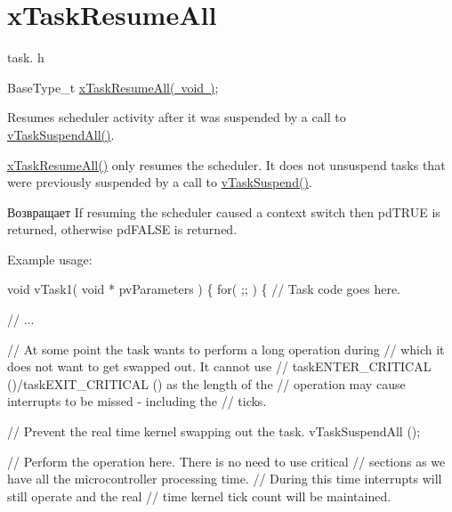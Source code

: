 \hypertarget{group__x_task_resume_all}{}\section{x\+Task\+Resume\+All}
\label{group__x_task_resume_all}
task. h 
\begin{DoxyPre}BaseType\_t \mbox{\hyperlink{task_8h_a003f8ae6d649225abd030cc76e1c7d0e}{xTaskResumeAll( void )}};\end{DoxyPre}


Resumes scheduler activity after it was suspended by a call to \mbox{\hyperlink{task_8h_a366b302eba79d10b5ee2a3756f0fcc43}{v\+Task\+Suspend\+All()}}.

\mbox{\hyperlink{task_8h_a003f8ae6d649225abd030cc76e1c7d0e}{x\+Task\+Resume\+All()}} only resumes the scheduler. It does not unsuspend tasks that were previously suspended by a call to \mbox{\hyperlink{task_8h_a84d4e660b04630be2939d91b3c2412f8}{v\+Task\+Suspend()}}.

\begin{DoxyReturn}{Возвращает}
If resuming the scheduler caused a context switch then pd\+T\+R\+UE is returned, otherwise pd\+F\+A\+L\+SE is returned.
\end{DoxyReturn}
Example usage\+: 
\begin{DoxyPre}
void vTask1( void * pvParameters )
\{
    for( ;; )
    \{
     // Task code goes here.\end{DoxyPre}



\begin{DoxyPre}     // ...\end{DoxyPre}



\begin{DoxyPre}     // At some point the task wants to perform a long operation during
     // which it does not want to get swapped out.  It cannot use
     // taskENTER\_CRITICAL ()/taskEXIT\_CRITICAL () as the length of the
     // operation may cause interrupts to be missed - including the
     // ticks.\end{DoxyPre}



\begin{DoxyPre}     // Prevent the real time kernel swapping out the task.
     vTaskSuspendAll ();\end{DoxyPre}



\begin{DoxyPre}     // Perform the operation here.  There is no need to use critical
     // sections as we have all the microcontroller processing time.
     // During this time interrupts will still operate and the real
     // time kernel tick count will be maintained.\end{DoxyPre}



